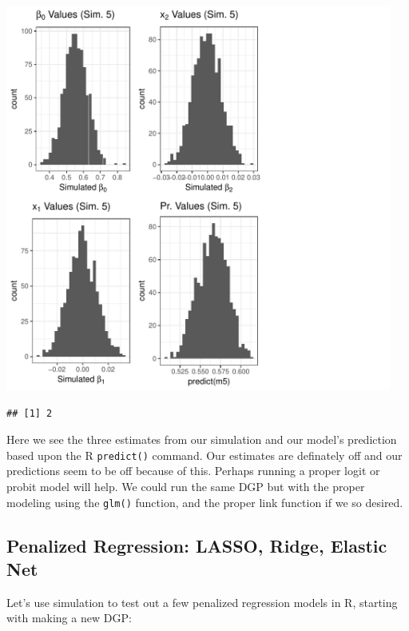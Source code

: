 \documentclass[12pt]{article}\usepackage[]{graphicx}\usepackage[]{color}
\makeatletter
\newenvironment{kframe}{%
 \def\at@end@of@kframe{}%
 \ifinner\ifhmode%
  \def\at@end@of@kframe{\end{minipage}}%
  \begin{minipage}{\columnwidth}%
 \fi\fi%
 \def\FrameCommand##1{\hskip\@totalleftmargin \hskip-\fboxsep
 \colorbox{shadecolor}{##1}\hskip-\fboxsep
     \hskip-\linewidth \hskip-\@totalleftmargin \hskip\columnwidth}%
 \MakeFramed {\advance\hsize-\width
   \@totalleftmargin\z@ \linewidth\hsize
   \@setminipage}}%
 {\par\unskip\endMakeFramed%
 \at@end@of@kframe}
\newenvironment{knitrout}{}{} %
\makeatother
\begin{document}
\begin{flushleft}
\begin{center}
\begin{knitrout}
\color{fgcolor}
\includegraphics[width=5in]{figure/hiddenplotlineartologit-1} 
\begin{kframe}\begin{verbatim}
## [1] 2
\end{verbatim}
\end{kframe}
\end{knitrout}
\end{center}

Here we see the three estimates from our simulation and our model's prediction based upon the R \texttt{predict()} command. Our estimates are definately off and our predictions seem to be off because of this. Perhaps running a proper logit or probit model will help. We could run the same DGP but with the proper modeling using the \texttt{glm()} function, and the proper link function if we so desired.


\subsection{Penalized Regression: LASSO, Ridge, Elastic Net}

Let's use simulation to test out a few penalized regression models in R, starting with making a new DGP:


\end{flushleft}
\end{document}
